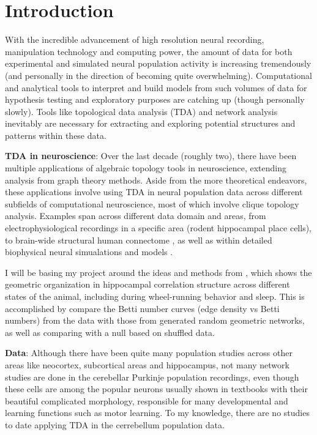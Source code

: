 \section{Introduction}

With the incredible advancement of high resolution neural recording, manipulation technology and computing power, the amount of data for both experimental and simulated neural population activity is increasing tremendously (and personally in the direction of becoming quite overwhelming). Computational and analytical tools to interpret and build models from such volumes of data for hypothesis testing and exploratory purposes are catching up (though personally slowly). Tools like topological data analysis (TDA) and network analysis inevitably are necessary for extracting and exploring potential structures and patterns within these data.

\textbf{TDA in neuroscience}: Over the last decade (roughly two), there have been multiple applications of algebraic topology tools in neuroscience, extending analysis from graph theory methods. Aside from the more theoretical endeavors, these applications involve using TDA in neural population data across different subfields of computational neuroscience, most of which involve clique topology analysis. Examples span across different data domain and areas, from electrophysiological recordings in a specific area \cite{Giusti2015-uo} (rodent hippocampal place cells), to brain-wide structural human connectome \cite{Sizemore2018-ql}, as well as within detailed biophysical neural simualations and models \cite{Reimann2017-ji}.

I will be basing my project around the ideas and methods from \cite{Giusti2015-uo}, which shows the geometric organization in hippocampal correlation structure across different states of the animal, including during wheel-running behavior and sleep. This is accomplished by compare the Betti number curves (edge density vs Betti numbers) from the data with those from generated random geometric networks, as well as comparing with a null based on shuffled data.

\textbf{Data}: Although there have been quite many population studies across other areas like neocortex, subcortical areas and hippocampus, not many network studies are done in the cerebellar Purkinje population recordings, even though these cells are among the popular neurons usually shown in textbooks with their beautiful complicated morphology, responsible for many developmental and learning functions such as motor learning. To my knowledge, there are no studies to date applying TDA in the cerrebellum population data.

